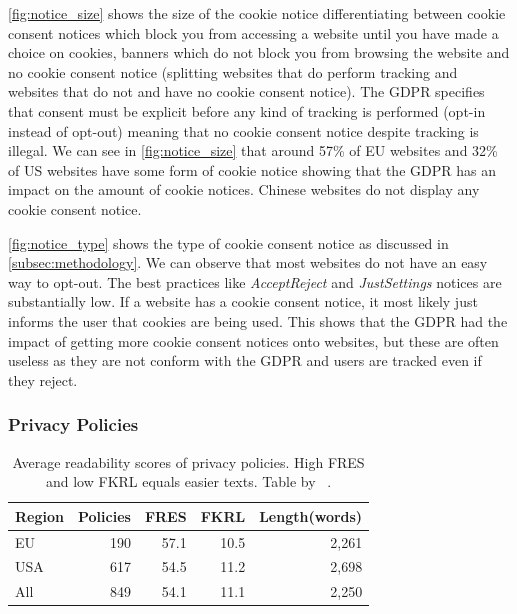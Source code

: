 \autoref{fig:notice_size} shows the size of the cookie notice differentiating between cookie consent notices which block
you from accessing a website until you have made a choice on cookies, banners which do not block you from browsing the
website and no cookie consent notice (splitting websites that do perform tracking and websites that do not and have no
cookie consent notice). The GDPR specifies that consent must be explicit before any kind of tracking is performed
(opt-in instead of opt-out) meaning that no cookie consent notice despite tracking is illegal.
We can see in \autoref{fig:notice_size} that around 57\% of EU websites and 32\% of US
websites have some form of cookie notice showing that the GDPR has an impact on the amount of cookie notices.
Chinese websites do not display any cookie consent notice.

\autoref{fig:notice_type} shows the type of cookie consent notice as discussed in \autoref{subsec:methodology}.
We can observe that most websites do not have an easy way to opt-out. The best practices like \emph{AcceptReject} and
\emph{JustSettings} notices are substantially low. If a website has a cookie consent notice, it
most likely just informs the user that cookies are being used. This shows that the GDPR had the impact of getting more
cookie consent notices onto websites, but these are often useless as they are not conform with the GDPR and users are
tracked even if they reject.

\subsubsection{Privacy Policies}

\begin{table}
    \begin{tabular}{ l r r r r }
        \hline
        Region & Policies & FRES & FKRL & Length(words) \\
        \hline
        EU & 190 & 57.1 & 10.5 & 2,261 \\
        USA & 617 & 54.5 & 11.2 & 2,698 \\
        All & 849 & 54.1 & 11.1 & 2,250 \\
        \hline
    \end{tabular}
    \caption{Average readability scores of privacy policies. High FRES and low FKRL equals easier texts. Table by
    \citeauthor{sanchez2019can}~\cite[Tab.~5]{sanchez2019can}.}
    \label{tab:policies}
\end{table}

